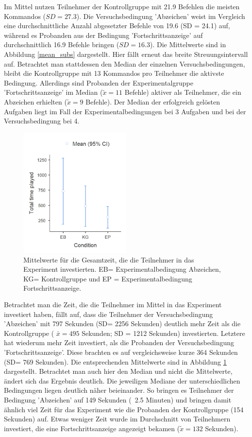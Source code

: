 Im Mittel nutzen Teilnehmer der Kontrollgruppe mit 21.9 Befehlen die meisten Kommandos ($SD = 27.3$). Die Versuchsbedingung 'Abzeichen' weist im Vergleich eine durchschnittliche Anzahl abgesetzter Befehle von 19.6 (SD = 24.1) auf, während es Probanden aus der Bedingung 'Fortschrittsanzeige' auf durchschnittlich 16.9 Befehle bringen ($SD=16.3$). Die Mittelwerte sind in Abbildung \ref{mean_subs} dargestellt. Hier fällt erneut das breite Streuungsintervall auf. Betrachtet man stattdessen den Median der einzelnen Versuchsbedingungen, bleibt die Kontrollgruppe mit 13 Kommandos pro Teilnehmer die aktivste Bedingung. Allerdings sind Probanden der Experimentalgruppe 'Fortschrittsanzeige' im Median ($\tilde x = 11$ Befehle) aktiver als Teilnehmer, die ein Abzeichen erhielten ($\tilde x = 9$ Befehle). Der Median der erfolgreich gelösten Aufgaben liegt im Fall der Experimentalbedingungen bei 3 Aufgaben und bei der Versuchsbedingung bei 4.

\begin{figure}[htbp]
    \centering
    \includegraphics[width=0.5\textwidth]{img/auswertung/mean_time.png}
    \caption{Mittelwerte für die Gesamtzeit, die die Teilnehmer in das Experiment investierten. EB= Experimentalbedingung Abzeichen, KG= Kontrollgruppe und EP = Experimentalbedingung Fortschrittsanzeige.}
    \label{mean_time}
\end{figure}

Betrachtet man die Zeit, die die Teilnehmer im Mittel in das Experiment investiert haben, fällt auf, dass die Teilnehmer der Versuchsbedingung 'Abzeichen' mit 797 Sekunden (SD= 2256 Sekunden) deutlich mehr Zeit als die Kontrollgruppe (	$\bar{x} = 495$ Sekunden; SD = 1212 Sekunden) investierten. Letztere hat wiederum mehr Zeit investiert, als die Probanden der Versuchsbedingung 'Fortschrittsanzeige'. Diese brachten es auf vergleichsweise kurze 364 Sekunden (SD= 769 Sekunden). Die entsprechenden Mittelwerte sind in Abbildung \ref{mean_time} dargestellt. Betrachtet man auch hier den Median und nicht die Mittelwerte, ändert sich das Ergebnis deutlich. Die jeweiligen Mediane der unterschiedlichen Bedingungen liegen deutlich näher beieinander. So bringen es Teilnehmer der Bedingung 'Abzeichen' auf 149 Sekunden (~2.5 Minuten) und bringen damit ähnlich viel Zeit für das Experiment wie die Probanden der Kontrollgruppe (154 Sekunden) auf. Etwas weniger Zeit wurde im Durchschnitt von Teilnehmern investiert, die eine Fortschrittsanzeige angezeigt bekamen ($\tilde x = 132$ Sekunden).

